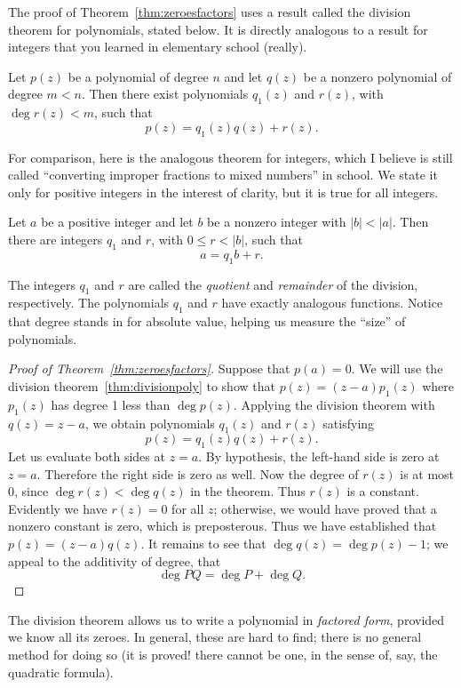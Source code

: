 \documentclass[twocolumn,12pt]{article}
\begin{document}
The proof of Theorem~\ref{thm:zeroesfactors} uses a result called the division theorem for polynomials, stated below. It is directly analogous to a result for integers that you learned in elementary school (really).
\begin{Theorem} \label{thm:divisionpoly}
  Let $p(z)$ be a polynomial of degree $n$ and let $q(z)$ be a nonzero polynomial of degree $m < n$. Then there exist polynomials $q_1(z)$ and $r(z)$, with $\deg{r(z)} < m$, such that
  \[
    p(z) = q_1(z) q(z) + r(z).
  \]
\end{Theorem}
For comparison, here is the analogous theorem for integers, which I believe is still called ``converting improper fractions to mixed numbers'' in school. We state it only for positive integers in the interest of clarity, but it is true for all integers.
\begin{Theorem} \label{thm:divisioninteger}
  Let $a$ be a positive integer and let $b$ be a nonzero integer with $|b| < |a|$. Then there are integers $q_1$ and $r$, with $0 \leq r < |b|$, such that
  \[
    a = q_1 b + r.
  \]
\end{Theorem}
The integers $q_1$ and $r$ are called the \emph{quotient} and \emph{remainder} of the division, respectively. The polynomials $q_1$ and $r$ have exactly analogous functions. Notice that degree stands in for absolute value, helping us measure the ``size'' of polynomials.
\begin{proof}[Proof of Theorem~\ref{thm:zeroesfactors}]
  Suppose that $p(a) = 0$. We will use the division theorem~\ref{thm:divisionpoly} to show that $p(z) = (z-a)p_1(z)$ where $p_1(z)$ has degree 1 less than $\deg{p(z)}$. Applying the division theorem with $q(z) = z-a$, we obtain polynomials $q_1(z)$ and $r(z)$ satisfying
  \[
    p(z) = q_1(z)q(z) + r(z).
  \]
  Let us evaluate both sides at $z = a$. By hypothesis, the left-hand side is zero at $z = a$. Therefore the right side is zero as well. Now the degree of $r(z)$ is at most 0, since $\deg{r(z)} < \deg{q(z)}$ in the theorem. Thus $r(z)$ is a constant. Evidently we have $r(z) = 0$ for all $z$; otherwise, we would have proved that a nonzero constant is zero, which is preposterous. Thus we have established that $p(z) = (z-a)q(z)$. It remains to see that $\deg{q(z)} = \deg{p(z)} - 1$; we appeal to the additivity of degree, that 
  $$\deg{PQ} = \deg{P} + \deg{Q}.$$
\end{proof}
The division theorem allows us to write a polynomial in \emph{factored form}, provided we know all its zeroes. In general, these are hard to find; there is no general method for doing so (it is proved! there cannot be one, in the sense of, say, the quadratic formula). 
\end{document}
